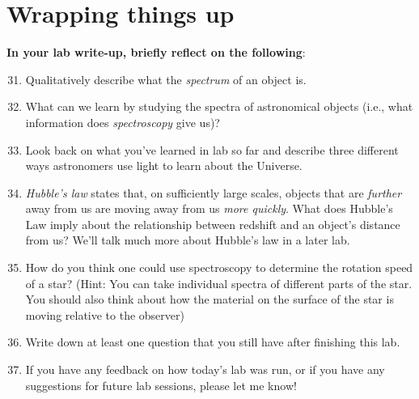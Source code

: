 \documentclass[11pt]{article}
\begin{document}
\section{Wrapping things up}
\textbf{In your lab write-up, briefly reflect on the following}:
\begin{enumerate}
    \setcounter{enumi}{30}
    
    \item Qualitatively describe what the \emph{spectrum} of an object is.
    
    \item What can we learn by studying the spectra of astronomical objects (i.e., what information does \emph{spectroscopy} give us)?
    
    \item Look back on what you've learned in lab so far and describe three different ways astronomers use light to learn about the Universe.
    
    \item \emph{Hubble's law} states that, on sufficiently large scales, objects that are \emph{further} away from us are moving away from us \emph{more quickly}. What does Hubble's Law imply about the relationship between redshift and an object's distance from us? We'll talk much more about Hubble's law in a later lab.
    
    \item How do you think one could use spectroscopy to determine the rotation speed of a star? (Hint: You can take individual spectra of different parts of the star. You should also think about how the material on the surface of the star is moving relative to the observer)
    
    \item Write down at least one question that you still have after finishing this lab.
    
    \item If you have any feedback on how today's lab was run, or if you have any suggestions for future lab sessions, please let me know!
    
\end{enumerate}
\end{document}
